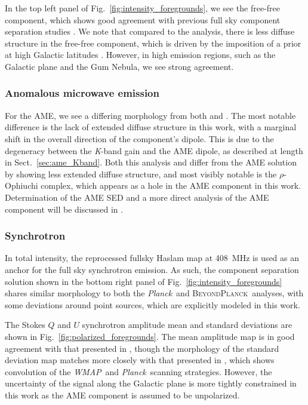 \documentclass[twocolumn]{../../common/aa}
\def\WMAP{\emph{WMAP}}
\def\Planck{\emph{Planck}}
\newcommand{\BP}{\textsc{BeyondPlanck}}
\newcommand{\K}[0]{\textit K}
\begin{document}
In the top left panel of Fig.~\ref{fig:intensity_foregrounds}, we see the free-free component, which shows good agreement with previous full sky component separation studies \citep{planck2014-a12,bp13}. We note that compared to the \cite{planck2014-a12} analysis, there is less diffuse structure in the free-free component, which is driven by the imposition of a prior at high Galactic latitudes \citep{bp13}. However, in high emission regions, such as the Galactic plane and the Gum Nebula, we see strong agreement.

\subsubsection{Anomalous microwave emission}\label{subsubsec:ame}

For the AME, we see a differing morphology from both \cite{planck2014-a12} and \cite{bp13}. The most notable difference is the lack of extended diffuse structure in this work, with a marginal shift in the overall direction of the component's dipole. This is due to the degeneracy between the \K-band gain and the AME dipole, as described at length in Sect.~\ref{sec:ame_Kband}. Both this analysis and \cite{bp13} differ from the \cite{planck2014-a12} AME solution by showing less extended diffuse structure, and most visibly notable is the $\rho$-Ophiuchi complex, which appears as a hole in the AME component in this work.  Determination of the AME SED and a more direct analysis of the AME component will be discussed in \citet{watts2023_ame}.

\subsubsection{Synchrotron}\label{subsub:synch}

In total intensity, the reprocessed fullsky Haslam map \citep{remazeilles2014} at 408~MHz is used as an anchor for the full sky synchrotron emission. As such, the component separation solution shown in the bottom right panel of Fig.~\ref{fig:intensity_foregrounds} shares similar morphology to both the \Planck\ and \BP\ analyses, with some deviations around point sources, which are explicitly modeled in this work. 

The Stokes $Q$ and $U$ synchrotron amplitude mean and standard deviations are shown in Fig.~\ref{fig:polarized_foregrounds}. The mean amplitude map is in good agreement with that presented in \cite{bp14}, though the morphology of the standard deviation map matches more closely with that presented in \cite{bp15}, which shows convolution of the \WMAP\ and \Planck\ scanning strategies. However, the uncertainty of the signal along the Galactic plane is more tightly constrained in this work as the AME component is assumed to be unpolarized.
\end{document}
